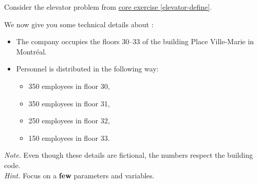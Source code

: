 
\begin{minipage}{.5\textwidth}	
\question
\label{elevator-assumptions}
Consider the elevator problem from \hyperref[elevator-define]{core exercise \ref{elevator-define}}. 


We now give you some technical details about :

\begin{itemize}
	\item The company occupies the floors 30--33 of the building Place Ville-Marie in Montr\'eal.

	\item Personnel is distributed in the following way: 
	\begin{itemize}
		\item 350 employees in floor 30,
		\item 350 employees in floor 31,
		\item 250 employees in floor 32, 
		\item 150 employees in floor 33.
	\end{itemize}
\end{itemize}

\emph{Note.} Even though these details are fictional, the numbers respect the building code. \\

\emph{Hint.} Focus on a \textbf{few} parameters and variables.
\end{minipage}
\qquad
\begin{minipage}{.5\textwidth}	
\email
\end{minipage}

